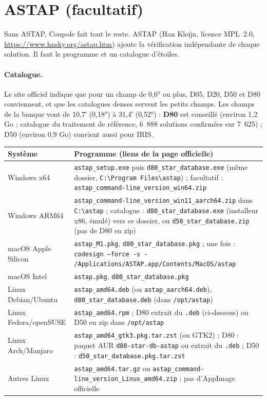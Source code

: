 \section{ASTAP (facultatif)}
Sans ASTAP, Coupole fait tout le reste. ASTAP (Han Kleijn, licence MPL~2.0, \url{https://www.hnsky.org/astap.htm})
ajoute la vérification indépendante de chaque solution. Il faut le programme et un catalogue d'étoiles.


\paragraph{Catalogue.} Le site officiel indique que pour un champ de 0,6° ou plus, D05, D20, D50 et D80 conviennent,
et que les catalogues denses servent les petits champs. Les champs de la banque vont de 10,7′ (0,18°) à 31,4′
(0,52°) : \textbf{D80} est conseillé (environ 1,2 Go ; catalogue du traitement de référence, 6~888 solutions
confirmées sur 7~625) ; D50 (environ 0,9 Go) convient aussi pour IRIS.

\begin{center}\small
\begin{tabularx}{\linewidth}{@{}lX@{}}
\toprule
\textbf{Système} & \textbf{Programme (liens de la page officielle)}\\
\midrule
Windows x64 & \texttt{astap\_setup.exe} puis \texttt{d80\_star\_database.exe} (même dossier, \texttt{C:\textbackslash Program Files\textbackslash astap}) ; facultatif : \texttt{astap\_command-line\_version\_win64.zip}\\
Windows ARM64 & \texttt{astap\_command-line\_version\_win11\_aarch64.zip} dans \texttt{C:\textbackslash astap} ; catalogue : \texttt{d80\_star\_database.exe} (installeur x86, émulé) vers ce dossier, ou \texttt{d50\_star\_database.zip} (pas de D80 en zip)\\
macOS Apple Silicon & \texttt{astap\_M1.pkg}, \texttt{d80\_star\_database.pkg} ; une fois : \texttt{codesign --force -s - /Applications/ASTAP.app/Contents/MacOS/astap}\\
macOS Intel & \texttt{astap.pkg}, \texttt{d80\_star\_database.pkg}\\
Linux Debian/Ubuntu & \texttt{astap\_amd64.deb} (ou \texttt{astap\_aarch64.deb}), \texttt{d80\_star\_database.deb} (dans \texttt{/opt/astap})\\
Linux Fedora/openSUSE & \texttt{astap\_amd64.rpm} ; D80 extrait du \texttt{.deb} (ci-dessous) ou D50 en zip dans \texttt{/opt/astap}\\
Linux Arch/Manjaro & \texttt{astap\_amd64\_gtk3.pkg.tar.zst} (ou GTK2) ; D80 : paquet AUR \texttt{d80-star-db-astap} ou extrait du \texttt{.deb} ; D50 : \texttt{d50\_star\_database.pkg.tar.zst}\\
Autres Linux & \texttt{astap\_amd64.tar.gz} ou \texttt{astap\_command-line\_version\_Linux\_amd64.zip} ; pas d'AppImage officielle\\
\bottomrule
\end{tabularx}
\end{center}

